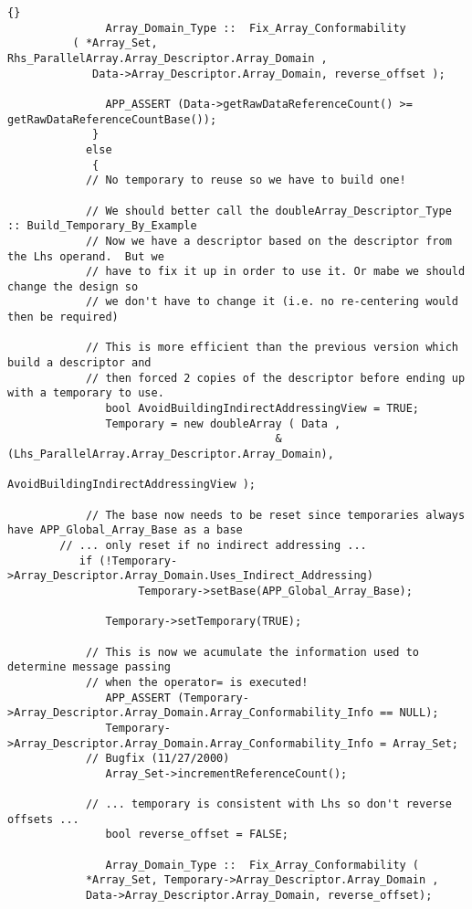 \documentclass[10pt]{llncs}
\begin{document}
\begin{lstlisting}{}
               Array_Domain_Type ::  Fix_Array_Conformability 
		  ( *Array_Set, Rhs_ParallelArray.Array_Descriptor.Array_Domain , 
		     Data->Array_Descriptor.Array_Domain, reverse_offset );

               APP_ASSERT (Data->getRawDataReferenceCount() >= getRawDataReferenceCountBase());
             }
            else
             {
            // No temporary to reuse so we have to build one!

            // We should better call the doubleArray_Descriptor_Type :: Build_Temporary_By_Example
            // Now we have a descriptor based on the descriptor from the Lhs operand.  But we
            // have to fix it up in order to use it. Or mabe we should change the design so 
            // we don't have to change it (i.e. no re-centering would then be required) 

            // This is more efficient than the previous version which build a descriptor and
            // then forced 2 copies of the descriptor before ending up with a temporary to use.
               bool AvoidBuildingIndirectAddressingView = TRUE;
               Temporary = new doubleArray ( Data ,
                                         &(Lhs_ParallelArray.Array_Descriptor.Array_Domain),
                                         AvoidBuildingIndirectAddressingView );

            // The base now needs to be reset since temporaries always have APP_Global_Array_Base as a base
	    // ... only reset if no indirect addressing ...
	       if (!Temporary->Array_Descriptor.Array_Domain.Uses_Indirect_Addressing)
                    Temporary->setBase(APP_Global_Array_Base);

               Temporary->setTemporary(TRUE);

            // This is now we acumulate the information used to determine message passing
            // when the operator= is executed!
               APP_ASSERT (Temporary->Array_Descriptor.Array_Domain.Array_Conformability_Info == NULL);
               Temporary->Array_Descriptor.Array_Domain.Array_Conformability_Info = Array_Set;
            // Bugfix (11/27/2000)
               Array_Set->incrementReferenceCount();

            // ... temporary is consistent with Lhs so don't reverse offsets ...
               bool reverse_offset = FALSE;

               Array_Domain_Type ::  Fix_Array_Conformability ( 
		    *Array_Set, Temporary->Array_Descriptor.Array_Domain , 
		    Data->Array_Descriptor.Array_Domain, reverse_offset);


\end{lstlisting}
\end{document}
